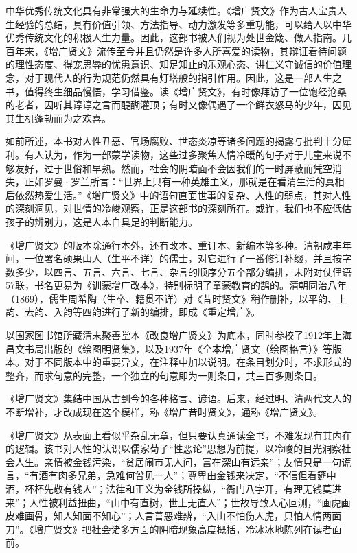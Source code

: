 \documentclass[12pt,UTF8]{ctexbook}
\begin{document}
中华优秀传统文化具有非常强大的生命力与延续性。《增广贤文》作为古人宝贵人生经验的总结，具有价值引领、方法指导、动力激发等多重功能，可以给人以中华优秀传统文化的积极人生力量。因此，这部书被人们视为处世金箴、做人指南。几百年来，《增广贤文》流传至今并且仍然是许多人所喜爱的读物，其辩证看待问题的理性态度、得宠思辱的忧患意识、知足知止的乐观心态、讲仁义守诚信的价值理念，对于现代人的行为规范仍然具有灯塔般的指引作用。因此，这是一部人生之书，值得终生细品慢悟，学习借鉴。读《增广贤文》，有时像拜访了一位饱经沧桑的老者，因听其谆谆之言而醍醐灌顶；有时又像偶遇了一个鲜衣怒马的少年，因见其生机蓬勃而为之欢喜。

如前所述，本书对人性丑恶、官场腐败、世态炎凉等诸多问题的揭露与批判十分犀利。有人认为，作为一部蒙学读物，这些过多聚焦人情冷暖的句子对于儿童来说不够友好，过于世俗和早熟。然而，社会的阴暗面不会因我们的一时屏蔽而凭空消失，正如罗曼·罗兰所言：“世界上只有一种英雄主义，那就是在看清生活的真相后依然热爱生活。”《增广贤文》中的语句直面世事的复杂、人性的弱点，其对人性的深刻洞见，对世情的冷峻观察，正是这部书的深刻所在。或许，我们也不应低估孩子的辨别力，这是人本自具足的判断能力。

《增广贤文》的版本除通行本外，还有改本、重订本、新编本等多种。清朝咸丰年间，一位署名硕果山人（生平不详）的儒士，对它进行了一番修订补缀，并且按字数多少，以四言、五言、六言、七言、杂言的顺序分五个部分编排，末附对仗俚语57联，书名更易为《训蒙增广改本》，特别标明了童蒙教育的鹄的。清朝同治八年（1869），儒生周希陶（生卒、籍贯不详）对《昔时贤文》稍作删补，以平韵、上韵、去韵、入韵等四韵进行了新的编排，即成《重定增广》。

以国家图书馆所藏清末聚善堂本《改良增广贤文》为底本，同时参校了1912年上海昌文书局出版的《绘图明贤集》，以及1937年《全本增广贤文（绘图格言）》等版本。对于不同版本中的重要异文，在注释中加以说明。在条目划分时，不求形式的整齐，而求句意的完整，一个独立的句意即为一则条目，共三百多则条目。



《增广贤文》集结中国从古到今的各种格言、谚语。后来，经过明、清两代文人的不断增补，才改成现在这个模样，称《增广昔时贤文》，通称《增广贤文》。

《增广贤文》从表面上看似乎杂乱无章，但只要认真通读全书，不难发现有其内在的逻辑。该书对人性的认识以儒家荀子“性恶论”思想为前提，以冷峻的目光洞察社会人生。亲情被金钱污染，“贫居闹市无人问，富在深山有远亲”；友情只是一句谎言，“有酒有肉多兄弟，急难何曾见一人”；尊卑由金钱来决定，“不信但看筵中酒，杯杯先敬有钱人”；法律和正义为金钱所操纵，“衙门八字开，有理无钱莫进来”；人性被利益扭曲，“山中有直树，世上无直人”；世故导致人心叵测，“画虎画皮难画骨，知人知面不知心”；人言善恶难辨，“入山不怕伤人虎，只怕人情两面刀”。《增广贤文》把社会诸多方面的阴暗现象高度概括，冷冰冰地陈列在读者面前。
\end{document}
